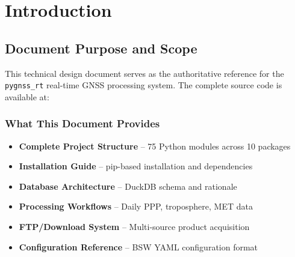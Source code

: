 \documentclass[11pt,a4paper,twoside]{report}
\newcommand{\github}{\textcolor{purple!70!black}{\textbf{GitHub}}}
\begin{document}
\chapter{Introduction}

\section{Document Purpose and Scope}

This technical design document serves as the authoritative reference for the \texttt{pygnss\_rt} real-time GNSS processing system. The complete source code is available at:

\begin{center}
\end{center}

\subsection{What This Document Provides}

\begin{itemize}
    \item \textbf{\textcolor{primaryblue}{Complete Project Structure}} -- 75 Python modules across 10 packages
    \item \textbf{\textcolor{primaryblue}{Installation Guide}} -- pip-based installation and dependencies
    \item \textbf{\textcolor{primaryblue}{Database Architecture}} -- DuckDB schema and rationale
    \item \textbf{\textcolor{primaryblue}{Processing Workflows}} -- Daily PPP, troposphere, MET data
    \item \textbf{\textcolor{primaryblue}{FTP/Download System}} -- Multi-source product acquisition
    \item \textbf{\textcolor{primaryblue}{Configuration Reference}} -- BSW YAML configuration format
\end{itemize}
\end{document}
